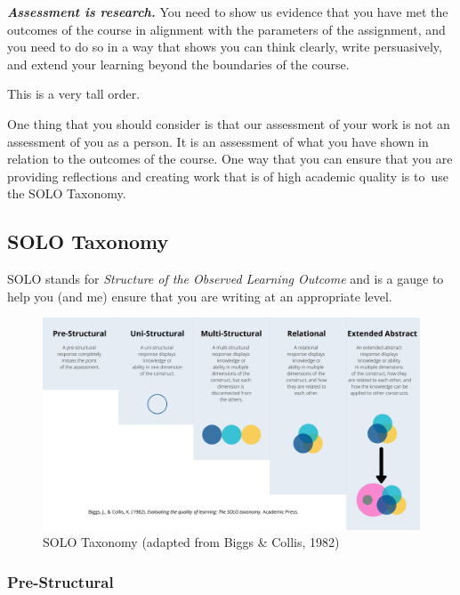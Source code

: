 \documentclass[
]{book}
\begin{document}
\textbf{\emph{Assessment is research.}} You need to show us evidence that you have met the outcomes of the course in alignment with the parameters of the assignment, and you need to do so in a way that shows you can think clearly, write persuasively, and extend your learning beyond the boundaries of the course.

This is a very tall order.

One thing that you should consider is that our assessment of your work is not an assessment of you as a person. It is an assessment of what you have shown in relation to the outcomes of the course. One way that you can ensure that you are providing reflections and creating work that is of high academic quality is to~use the SOLO Taxonomy.

\hypertarget{solo-taxonomy}{%
\subsection*{SOLO Taxonomy}\label{solo-taxonomy}}

SOLO stands for \emph{Structure of the Observed Learning Outcome} and is a gauge to help you (and me) ensure that you are writing at an appropriate level.

\begin{figure}
\centering
\includegraphics{assets/SOLO-taxonomy.png}
\caption{SOLO Taxonomy (adapted from Biggs \& Collis, 1982)}
\end{figure}

\hypertarget{pre-structural}{%
\subsubsection*{Pre-Structural}\label{pre-structural}}
\end{document}
